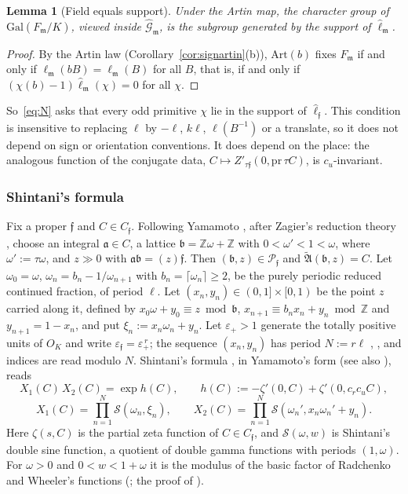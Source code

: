 \documentclass[11pt]{amsart}
\numberwithin{equation}{section}
\theoremstyle{plain}
\newtheorem{lemma}[theorem]{Lemma}
\theoremstyle{definition}
\theoremstyle{remark}
\begin{document}
\begin{lemma}[Field equals support]\label{lem:fieldsupport}
Under the Artin map, the character group of \(\mathrm{Gal}(F_{\mathfrak m}/K)\), viewed inside \(\widehat{\mathcal G}_{\mathfrak m}\), is the subgroup generated by the support of \(\hat\ell_{\mathfrak m}\).
\end{lemma}

\begin{proof}
By the Artin law (Corollary~\ref{cor:signartin}(b)), \(\mathrm{Art}(b)\) fixes \(F_{\mathfrak m}\) if and only if \(\ell_{\mathfrak m}(bB)=\ell_{\mathfrak m}(B)\) for all \(B\), that is, if and only if \((\chi(b)-1)\hat\ell_{\mathfrak m}(\chi)=0\) for all \(\chi\).
\end{proof}

So~\eqref{eq:N} asks that every odd primitive \(\chi\) lie in the support of \(\hat\ell_{\mathfrak f}\). This condition is insensitive to replacing \(\ell\) by \(-\ell\), \(k\ell\), \(\ell(B^{-1})\) or a translate, so it does not depend on sign or orientation conventions. It does depend on the place: the analogous function of the conjugate data, \(C\mapsto Z'_{\tau\mathfrak f}(0,\mathrm{pr}\,\tau C)\), is \(c_u\)-invariant.

\subsubsection*{Shintani's formula}
Fix a proper \(\mathfrak f\) and \(C\in C_{\mathfrak f}\). Following Yamamoto \cite[\S2.1]{Ya08}, after Zagier's reduction theory \cite{Zag75}, choose an integral \(\mathfrak a\in C\), a lattice \(\mathfrak b=\mathbb Z\omega+\mathbb Z\) with \(0<\omega'<1<\omega\), where \(\omega':=\tau\omega\), and \(z\gg0\) with \(\mathfrak a\mathfrak b=(z)\mathfrak f\). Then \((\mathfrak b,z)\in\mathcal P_{\mathfrak f}\) and \(\widetilde{\mathfrak A}(\mathfrak b,z)=C\). Let \(\omega_0=\omega\), \(\omega_n=b_n-1/\omega_{n+1}\) with \(b_n=\lceil\omega_n\rceil\ge2\), be the purely periodic reduced continued fraction, of period \(\ell\). Let \((x_n,y_n)\in(0,1]\times[0,1)\) be the point \(z\) carried along it, defined by \(x_0\omega+y_0\equiv z\bmod\mathfrak b\), \(x_{n+1}\equiv b_nx_n+y_n\bmod\mathbb Z\) and \(y_{n+1}=1-x_n\), and put \(\xi_n:=x_n\omega_n+y_n\). Let \(\varepsilon_+>1\) generate the totally positive units of \(O_K\) and write \(\varepsilon_{\mathfrak f}=\varepsilon_+^{\,r}\); the sequence \((x_n,y_n)\) has period \(N:=r\ell\) \cite[\S2.1]{Ya08}, \cite[\S2.3]{RW}, and indices are read modulo \(N\). Shintani's formula \cite[Prop.~3]{Sh}, in Yamamoto's form \cite[Thm.~5.1.1]{Ya08} (see also \cite[Prop.~4]{RW}), reads
\[X_1(C)\,X_2(C)=\exp h(C),\qquad h(C):=-\zeta'(0,C)+\zeta'(0,c_rc_uC),\]
\[X_1(C)=\prod_{n=1}^N\mathcal S(\omega_n,\xi_n),\qquad X_2(C)=\prod_{n=1}^N\mathcal S(\omega_n',x_n\omega_n'+y_n).\]
Here \(\zeta(s,C)\) is the partial zeta function of \(C\in C_{\mathfrak f}\), and \(\mathcal S(\omega,w)\) is Shintani's double sine function, a quotient of double gamma functions with periods \((1,\omega)\). For \(\omega>0\) and \(0<w<1+\omega\) it is the modulus of the basic factor of Radchenko and Wheeler's functions (\cite[Prop.~5]{Sh}; the proof of \cite[Prop.~5]{RW}).
\end{document}

